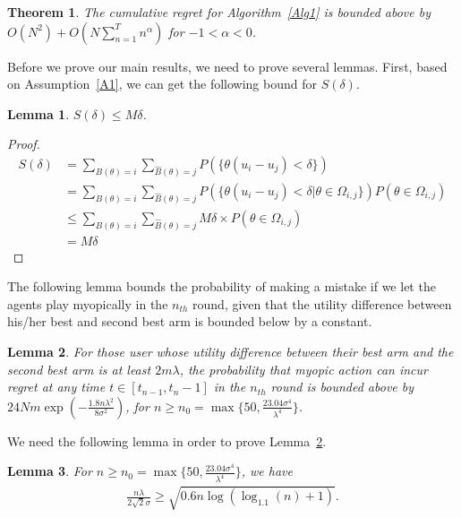 \documentclass{article}
\newtheorem{theorem}{Theorem}
\newtheorem{lemma}{Lemma}
\begin{document}
\begin{theorem}
The cumulative regret for Algorithm~\ref{Alg1} is bounded above by $O(N^2) + O(N \sum_{n=1}^{T}n^{\alpha})$ for $-1<\alpha<0$.
\label{rst:regret}
\end{theorem}

Before we prove our main results, we need to prove several lemmas. First, based on Assumption~\ref{A1}, we can get the following bound for $S(\delta)$.

\begin{lemma}
$S(\delta)\leq M\delta$.
\label{lemma:sdelta}
\end{lemma}

\begin{proof}
\begin{align}
S(\delta)&=\sum_{B(\theta)=i}\sum_{\hat{B}(\theta)=j}P(\{\theta(u_{i}-u_{j})<\delta\}) \nonumber \\
&=\sum_{B(\theta)=i}\sum_{\hat{B}(\theta)=j}P(\{\theta(u_{i}-u_{j})<\delta|\theta\in \Omega_{i,j}\})P(\theta\in \Omega_{i,j}) \nonumber \\
&\leq \sum_{B(\theta)=i}\sum_{\hat{B}(\theta)=j}M\delta \times P(\theta\in \Omega_{i,j}) \nonumber \\
&=M\delta \nonumber 
\end{align}
\end{proof}

The following lemma bounds the probability of making a mistake if we let the agents play myopically in the $n_{th}$ round, given that the utility difference between his/her best and second best arm is bounded below by a constant.

\begin{lemma}
For those user whose utility difference between their best arm and the second best arm is at least $2m\lambda$, the probability that myopic action can incur regret at any time $t\in [t_{n-1},t_{n}-1]$ in the $n_{th}$ round is bounded above by $24Nm\exp\left(-\frac{1.8n\lambda^2}{8\sigma^2}\right)$, for $n\geq n_{0}=\max\{50, \frac{23.04\sigma^4}{\lambda^4}\}$.
\label{round:prob}
\end{lemma}


We need the following lemma in order to prove Lemma~\ref{round:prob}.

\begin{lemma}
For $n\geq n_{0}=\max\{50, \frac{23.04\sigma^4}{\lambda^4}\}$, we have
\begin{align}
\frac{n\lambda}{2\sqrt{2}\sigma}\geq \sqrt{0.6n\log(\log_{1.1}(n)+1)}. \nonumber
\end{align}
\label{n0-inequality}
\end{lemma}
\end{document}
